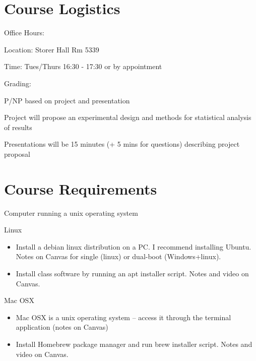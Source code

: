 \documentclass[xetex]{beamer}
\begin{document}
\section{Course Logistics}
\label{sec:orgc4e3873}
\begin{frame}[label={sec:org8c992d1}]{Office Hours:}
\begin{block}{Location: Storer Hall Rm 5339}
\end{block}
\begin{block}{Time: Tues/Thurs 16:30 - 17:30 or by appointment}
\end{block}
\end{frame}
\begin{frame}[label={sec:orgdcb9c2d}]{Grading:}
\begin{block}{P/NP based on project and presentation}
\end{block}
\begin{block}{Project will propose an experimental design and methods for statistical analysis of results}
\end{block}
\begin{block}{Presentations will be 15 minutes (+ 5 mins for questions) describing project proposal}
\end{block}
\end{frame}
\section{Course Requirements}
\label{sec:orgd77f4e0}
\begin{frame}[label={sec:org6df8151}]{Computer running a unix operating system}
\begin{block}{Linux}
\begin{itemize}
\item Install a debian linux distribution on a PC. I recommend installing Ubuntu. Notes on Canvas for single (linux) or dual-boot (Windows+linux).
\item Install class software by running an apt installer script. Notes and video on Canvas.
\end{itemize}
\end{block}
\begin{block}{Mac OSX}
\begin{itemize}
\item Mac OSX is a unix operating system -- access it through the terminal application (notes on Canvas)
\item Install Homebrew package manager and run brew installer script. Notes and video on Canvas.
\end{itemize}
\end{block}
\end{frame}
\end{document}
